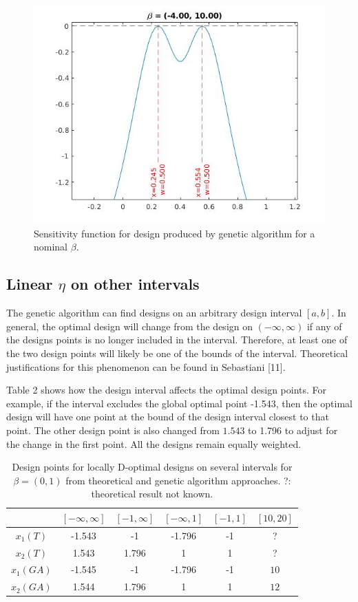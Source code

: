 \documentclass[11pt,a4paper]{article}
\begin{document}
\begin{figure}
\centering
\includegraphics[scale=0.5]{figures/fig1.jpg}
\caption{Sensitivity function for design produced by genetic algorithm for a nominal $\beta$.}
\end{figure}

\subsection{Linear $\eta$ on other intervals}
The genetic algorithm can find designs on an arbitrary design interval $[a,b]$. In general, the optimal design will change from the design on $(-\infty, \infty)$ if any of the designs points is no longer included in the interval. Therefore, at least one of the two design points will likely be one of the bounds of the interval. Theoretical justifications for this phenomenon can be found in Sebastiani [11]. 

Table 2 shows how the design interval affects the optimal design points. For example, if the interval excludes the global optimal point -1.543, then the optimal design will have one point at the bound of the design interval closest to that point. The other design point is also changed from $1.543$ to 1.796 to adjust for the change in the first point. All the designs remain equally weighted.

\begin{table}
\centering
\begin{tabular}{|c|c|c|c|c|c|}
\hline 
  & $[-\infty, \infty]$  & $[-1, \infty]$ & $[-\infty,1]$ & $[-1,1]$ & $[10, 20]$\\ 
\hline 
$x_1 (T)$ & -1.543 & -1 & -1.796 & -1  & ?\\ 
\hline 
$x_2 (T)$ & 1.543 & 1.796 & 1 & 1 & ?\\ 

\hline
$x_1 (GA)$ & -1.545 & -1 & -1.796 & -1 & $10$\\
\hline
$x_2 (GA)$ & 1.544 & 1.796 & 1 & 1 & $12$\\
\hline
\end{tabular}
\caption{Design points for locally D-optimal designs on several intervals for $\beta = (0,1)$ from theoretical and genetic algorithm approaches. ?: theoretical result not known.}
\end{table}
\end{document}
